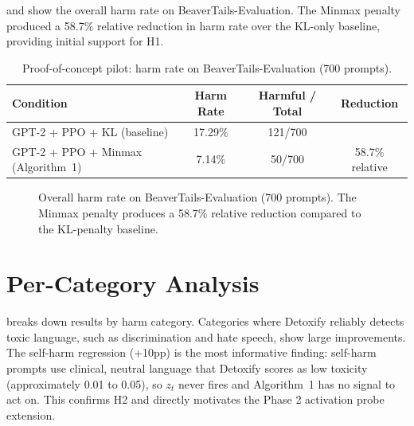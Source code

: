 \documentclass[a4paper,twoside,12pt]{report}
\begin{document}
 and  show the overall harm rate on
BeaverTails-Evaluation. The Minmax penalty produced a 58.7\% relative reduction in harm rate
over the KL-only baseline, providing initial support for H1.

\begin{table}[ht]
  \centering
  \caption{Proof-of-concept pilot: harm rate on BeaverTails-Evaluation (700 prompts).}
  \label{tab:results}
  \begin{tabular}{lccc}
    \toprule
    \textbf{Condition} & \textbf{Harm Rate} & \textbf{Harmful / Total} & \textbf{Reduction} \\
    \midrule
    GPT-2 + PPO + KL (baseline)        & 17.29\% & 121/700 & \\
    GPT-2 + PPO + Minmax (Algorithm~1) & 7.14\%  & 50/700  & 58.7\% relative \\
    \bottomrule
  \end{tabular}
\end{table}

\begin{figure}[ht]
\centering
{}
\caption{Overall harm rate on BeaverTails-Evaluation (700 prompts). The Minmax penalty
  produces a 58.7\% relative reduction compared to the KL-penalty baseline.}
\label{fig:harm_rate_bar}
\end{figure}

\section{Per-Category Analysis}

 breaks down results by harm category. Categories where Detoxify
reliably detects toxic language, such as discrimination and hate speech, show large
improvements. The self-harm regression (+10pp) is the most informative finding: self-harm
prompts use clinical, neutral language that Detoxify scores as low toxicity (approximately
0.01 to 0.05), so $z_t$ never fires and Algorithm~1 has no signal to act on. This confirms
H2 and directly motivates the Phase 2 activation probe extension.
\end{document}
